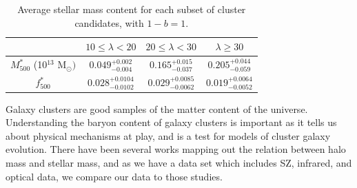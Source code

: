 \documentclass[a4paper,fleqn,usenatbib]{mnras}
\begin{document}
\begin{table}
  
  \centering
  \caption{Average stellar mass content for each subset of cluster candidates, with $1-b=1$.}
  \begin{threeparttable}
  \begin{tabular}{|*{4}{c|}}
    \hline
    & $10 \leq \lambda < 20$ & $20 \leq \lambda < 30$ & $\lambda \geq 30$ \\ \hline
	 $M^{\ast}_{500}$ (10$^{13}$ M$_{\odot})$ & $0.049^{+0.002}_{-0.004}$ & $0.165^{+0.015}_{-0.037}$ & $0.205^{+0.044}_{-0.059}$ \\ \hline
     $f^{\ast}_{500}$ & $0.028^{+0.0104}_{-0.0102}$ & $0.029^{+0.0085}_{-0.0062}$ & $0.019^{+0.0064}_{-0.0052}$ \\ \hline
    
    \end{tabular}
  \end{threeparttable}
\label{table:stellarmass}
\end{table}

Galaxy clusters are good samples of the matter content of the universe. Understanding the baryon content of galaxy clusters is important as it tells us about physical mechanisms at play, and is a test for models of cluster galaxy evolution. There have been several works mapping out the relation between halo mass and stellar mass, and as we have a data set which includes SZ, infrared, and optical data, we compare our data to those studies. 
\end{document}
